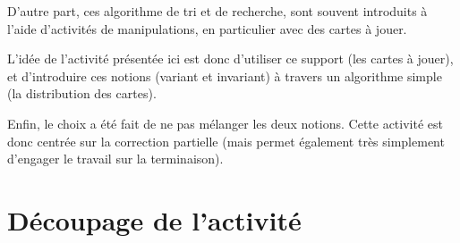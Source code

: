 D'autre part, ces algorithme de tri et de recherche, sont souvent introduits à l'aide d'activités  de manipulations, en particulier avec des cartes à jouer.

L'idée de l'activité présentée ici est donc d'utiliser ce support (les cartes à jouer), et d'introduire ces notions (variant et invariant) à travers un algorithme simple (la distribution des cartes).

Enfin, le choix a été fait de ne pas mélanger les deux notions. Cette activité est donc centrée sur la correction partielle (mais permet également très simplement d'engager le travail sur la terminaison).


\section{Découpage de l'activité}


